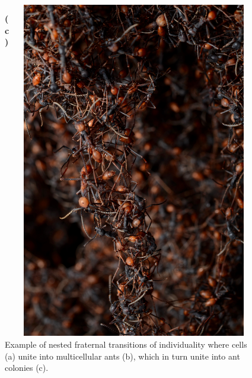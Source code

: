 \begin{figure}
\begin{columns}
\begin{column}{0.65\textwidth}
  \end{column}
  \begin{column}{0.05\textwidth}
    \cite{quinzani_2008}
  \end{column}
  \end{columns}
  \begin{columns}
  \begin{column}{0.10\textwidth}
    \textbf{(c)}
  \end{column}
  \begin{column}{0.65\textwidth}
    \includegraphics[angle=270,width=\textwidth]{img/ant_bridge}
  \end{column}
  \begin{column}{0.05\textwidth}
    \cite{gallice_2011}
  \end{column}
  \end{columns}
 \caption{
 Example of nested fraternal transitions of individuality where cells (a) unite into multicellular ants (b), which in turn unite into ant colonies (c).
 }
 \label{fig:fraternal}
\end{figure}
